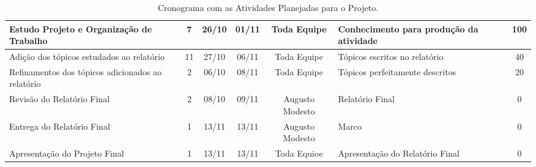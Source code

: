 \begin{landscape}
\begin{table}[h]
\begin{tabular}{|p{7cm}|c|c|c|c|p{4cm}|c|}
				Estudo Projeto e Organização de Trabalho & 7 & 26/10 & 01/11 & Toda Equipe & Conhecimento para produção da atividade & 100 \\ \hline
				Adição dos tópicos estudados ao relatório & 11 & 27/10 & 06/11 & Toda Equipe & Tópicos escritos no relatório & 40 \\ \hline
				Refinamentos dos tópicos adicionados ao relatório & 2 & 06/10 & 08/11 & Toda Equipe & Tópicos perfeitamente descritos & 20 \\ \hline
				Revisão do Relatório Final & 2 & 08/10 & 09/11 & Augusto Modesto & Relatório Final & 0 \\ \hline
				Entrega do Relatório Final & 1 & 13/11 & 13/11 & Augusto Modesto & Marco & 0 \\ \hline
				Apresentação do Projeto Final & 1 & 13/11 & 13/11 & Toda Equioe & Apresentação do Relatório Final & 0 \\ \hline

			\end{tabular}
			\caption[Cronograma com as Atividades Planejadas para o Projeto]{Cronograma com as Atividades Planejadas para o Projeto.}
			\label{tab:cronograma_.table}
		\end{table}

\end{landscape}
